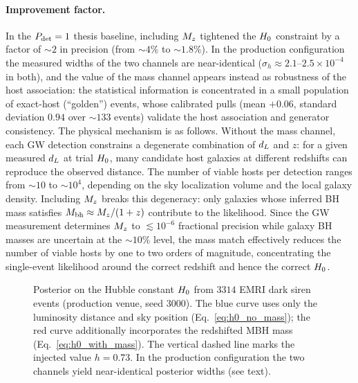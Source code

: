 \paragraph{Improvement factor.}
In the $P_\mathrm{det} = 1$ thesis baseline, including $M_z$ tightened the
$H_0$ constraint by a factor of $\sim 2$ in precision (from
$\sim 4\%$ to $\sim 1.8\%$). In the production configuration the
measured widths of the two channels are near-identical
($\sigma_h \approx 2.1$--$2.5\times10^{-4}$ in both), and the value of
the mass channel appears instead as robustness of the host
association: the statistical information is concentrated in a small
population of exact-host (``golden'') events, whose calibrated pulls
(mean $+0.06$, standard deviation $0.94$ over $\sim 133$ events)
validate the host association and generator consistency.
The physical mechanism is as follows. Without the
mass channel, each GW detection constrains a degenerate combination of
$d_L$ and $z$: for a given measured $d_L$ at trial $H_0$, many candidate
host galaxies at different redshifts can reproduce the observed distance.
The number of viable hosts per detection ranges from $\sim 10$ to
$\sim 10^4$, depending on the sky localization volume and the local
galaxy density. Including $M_z$ breaks this degeneracy: only galaxies
whose inferred BH mass satisfies
$M_\mathrm{bh} \approx M_z / (1+z)$ contribute to the likelihood. Since the GW
measurement determines $M_z$ to $\lesssim 10^{-6}$ fractional precision
while galaxy BH masses are uncertain at the $\sim 10\%$ level, the mass
match effectively reduces the number of viable hosts by one to two orders
of magnitude, concentrating the single-event likelihood around the
correct redshift and hence the correct $H_0$.

\begin{figure}[t]
  \centering
  \caption{Posterior on the Hubble constant $H_0$ from
  $3314$ EMRI dark siren events (production venue, seed 3000). The
  blue curve uses only the luminosity distance and sky position
  (Eq.~\ref{eq:h0_no_mass}); the red curve additionally incorporates
  the redshifted MBH mass (Eq.~\ref{eq:h0_with_mass}). The vertical
  dashed line marks the injected value $h = 0.73$. In the production
  configuration the two channels yield near-identical posterior widths
  (see text).}
  \label{fig:posterior_comparison}
\end{figure}

